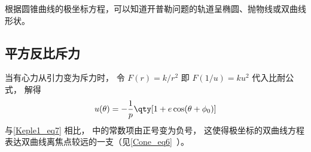 根据圆锥曲线的极坐标方程，可以知道开普勒问题的轨道呈椭圆、抛物线或双曲线形状。

\subsection{平方反比斥力}
当有心力从引力变为斥力时， 令 $F(r) = k/r^2$ 即 $F(1/u) = ku^2$ 代入比耐公式， 解得
\begin{equation}%
u(\theta) = -\frac{1}{p} \qty[1 + e\cos(\theta  + \phi_0)]
\end{equation}
与\autoref{Keple1_eq7} 相比， 中的常数项由正号变为负号， 这使得极坐标的双曲线方程表达双曲线离焦点较远的一支（见\autoref{Cone_eq6}~）。
